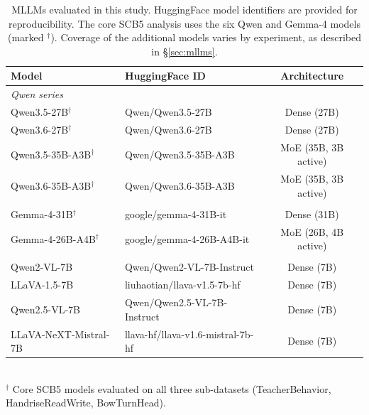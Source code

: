 \documentclass[a4paper,fleqn]{cas-sc}
\begin{document}
\begin{table}[t]
\caption{MLLMs evaluated in this study. HuggingFace model identifiers are provided for reproducibility. The core SCB5 analysis uses the six Qwen and Gemma-4 models (marked $^\dagger$). Coverage of the additional models varies by experiment, as described in \S\ref{sec:mllms}.}
\label{tab:mllms}
\centering
\footnotesize
\setlength{\tabcolsep}{2.5pt}
\begin{tabular}{llc}
\toprule
\textbf{Model} & \textbf{HuggingFace ID} & \textbf{Architecture} \\
\midrule
\multicolumn{3}{l}{\textit{Qwen series}} \\
Qwen3.5-27B$^\dagger$ & Qwen/Qwen3.5-27B & Dense (27B) \\
Qwen3.6-27B$^\dagger$ & Qwen/Qwen3.6-27B & Dense (27B) \\
Qwen3.5-35B-A3B$^\dagger$ & Qwen/Qwen3.5-35B-A3B & MoE (35B, 3B active) \\
Qwen3.6-35B-A3B$^\dagger$ & Qwen/Qwen3.6-35B-A3B & MoE (35B, 3B active) \\
\addlinespace
\multicolumn{3}{l}{\textit{Google Gemma series}} \\
Gemma-4-31B$^\dagger$ & google/gemma-4-31B-it & Dense (31B) \\
Gemma-4-26B-A4B$^\dagger$ & google/gemma-4-26B-A4B-it & MoE (26B, 4B active) \\
\addlinespace
\multicolumn{3}{l}{\textit{Additional MLLMs}} \\
Qwen2-VL-7B & Qwen/Qwen2-VL-7B-Instruct & Dense (7B) \\
LLaVA-1.5-7B & liuhaotian/llava-v1.5-7b-hf & Dense (7B) \\
Qwen2.5-VL-7B & Qwen/Qwen2.5-VL-7B-Instruct & Dense (7B) \\
LLaVA-NeXT-Mistral-7B & llava-hf/llava-v1.6-mistral-7b-hf & Dense (7B) \\
\bottomrule
\end{tabular}
\\[2pt]
\footnotesize{$^\dagger$ Core SCB5 models evaluated on all three sub-datasets (TeacherBehavior, HandriseReadWrite, BowTurnHead).}
\end{table}
\end{document}
